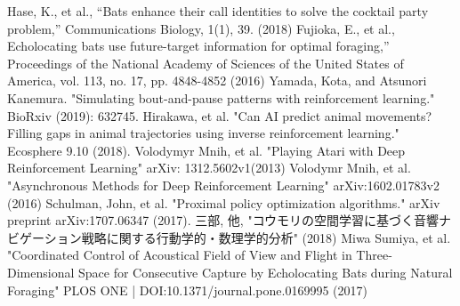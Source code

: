 \documentclass[../main]{subfiles}
\begin{document}
\begin{thebibliography}{99}
    Hase, K., et al., “Bats enhance their call identities to solve the cocktail party problem,” Communications Biology, 1(1), 39. (2018)
    Fujioka, E., et al., Echolocating bats use future-target information for optimal foraging,” Proceedings of the National Academy of Sciences of the United States of America, vol. 113, no. 17, pp. 4848-4852 (2016)
    Yamada, Kota, and Atsunori Kanemura. "Simulating bout-and-pause patterns with reinforcement learning." BioRxiv (2019): 632745.
    Hirakawa, et al. "Can AI predict animal movements? Filling gaps in animal trajectories using inverse reinforcement learning." Ecosphere 9.10 (2018).
    Volodymyr Mnih, et al. "Playing Atari with Deep Reinforcement Learning" arXiv: 1312.5602v1(2013)
   Volodymr Mnih, et al. "Asynchronous Methods for Deep Reinforcement Learning" arXiv:1602.01783v2 (2016)
    Schulman, John, et al. "Proximal policy optimization algorithms." arXiv preprint arXiv:1707.06347 (2017).
   三部, 他, "コウモリの空間学習に基づく音響ナビゲーション戦略に関する行動学的・数理学的分析" (2018)
   Miwa Sumiya, et al. "Coordinated Control of Acoustical Field of View and Flight in Three-Dimensional Space for Consecutive Capture by Echolocating Bats during Natural Foraging" PLOS ONE | DOI:10.1371/journal.pone.0169995 (2017)
  
\end{thebibliography}
\end{document}
